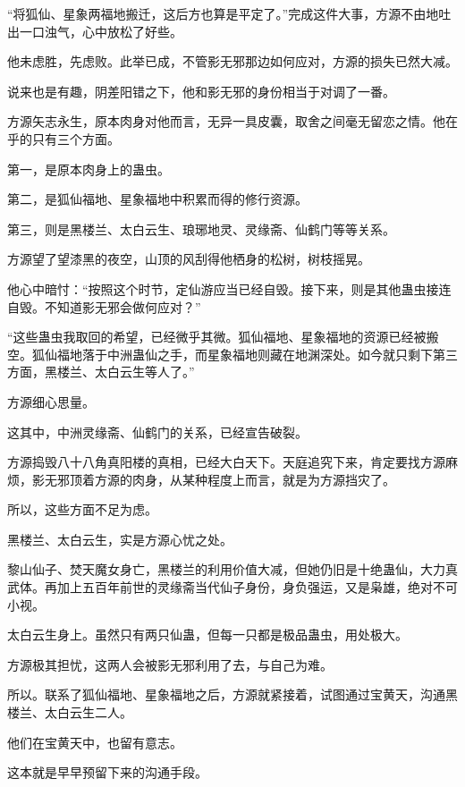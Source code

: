 
\begin{this_body}



“将狐仙、星象两福地搬迁，这后方也算是平定了。”完成这件大事，方源不由地吐出一口浊气，心中放松了好些。

他未虑胜，先虑败。此举已成，不管影无邪那边如何应对，方源的损失已然大减。

说来也是有趣，阴差阳错之下，他和影无邪的身份相当于对调了一番。

方源矢志永生，原本肉身对他而言，无异一具皮囊，取舍之间毫无留恋之情。他在乎的只有三个方面。

第一，是原本肉身上的蛊虫。

第二，是狐仙福地、星象福地中积累而得的修行资源。

第三，则是黑楼兰、太白云生、琅琊地灵、灵缘斋、仙鹤门等等关系。

方源望了望漆黑的夜空，山顶的风刮得他栖身的松树，树枝摇晃。

他心中暗忖：“按照这个时节，定仙游应当已经自毁。接下来，则是其他蛊虫接连自毁。不知道影无邪会做何应对？”

“这些蛊虫我取回的希望，已经微乎其微。狐仙福地、星象福地的资源已经被搬空。狐仙福地落于中洲蛊仙之手，而星象福地则藏在地渊深处。如今就只剩下第三方面，黑楼兰、太白云生等人了。”

方源细心思量。

这其中，中洲灵缘斋、仙鹤门的关系，已经宣告破裂。

方源捣毁八十八角真阳楼的真相，已经大白天下。天庭追究下来，肯定要找方源麻烦，影无邪顶着方源的肉身，从某种程度上而言，就是为方源挡灾了。

所以，这些方面不足为虑。

黑楼兰、太白云生，实是方源心忧之处。

黎山仙子、焚天魔女身亡，黑楼兰的利用价值大减，但她仍旧是十绝蛊仙，大力真武体。再加上五百年前世的灵缘斋当代仙子身份，身负强运，又是枭雄，绝对不可小视。

太白云生身上。虽然只有两只仙蛊，但每一只都是极品蛊虫，用处极大。

方源极其担忧，这两人会被影无邪利用了去，与自己为难。

所以。联系了狐仙福地、星象福地之后，方源就紧接着，试图通过宝黄天，沟通黑楼兰、太白云生二人。

他们在宝黄天中，也留有意志。

这本就是早早预留下来的沟通手段。


\end{this_body}
